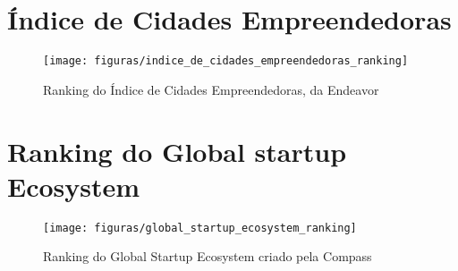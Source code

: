 \begin{anexosenv}

\partanexos

\chapter{Índice de Cidades Empreendedoras}

\begin{figure}[!htb]
\centering
\texttt{[image: figuras/indice\_de\_cidades\_empreendedoras\_ranking]}
\caption{Ranking do Índice de Cidades Empreendedoras, da Endeavor}
\label{figure:indice_de_cidades_empreendedoras_ranking}
\end{figure}

\chapter{Ranking do Global startup Ecosystem}

\begin{figure}[!htb]
\centering
\texttt{[image: figuras/global\_startup\_ecosystem\_ranking]}
\caption{Ranking do Global Startup Ecosystem criado pela Compass}
\label{figure:global_startup_ecosystem_ranking}
\end{figure}

\end{anexosenv}


